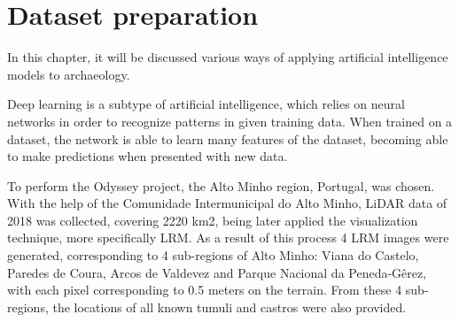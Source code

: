 
\chapter{Dataset preparation}

\begin{introduction}
In this chapter, it will be discussed various ways of applying artificial intelligence models to archaeology.
\end{introduction}





Deep learning is a subtype of artificial intelligence, which relies on neural networks in order to recognize patterns in given training data. When trained on a dataset, the network is able to learn many features of the dataset, becoming able to make predictions when presented with new data.



%
%

To perform the Odyssey project, the Alto Minho region, Portugal, was chosen. With the help of the Comunidade Intermunicipal do Alto Minho, LiDAR data of 2018 was collected, covering 2220 km2, being later applied the visualization technique, more specifically LRM. As a result of this process 4 LRM images were generated, corresponding to 4 sub-regions of Alto Minho: Viana do Castelo, Paredes de Coura, Arcos de Valdevez and Parque Nacional da Peneda-Gêrez, with each pixel corresponding to 0.5 meters on the terrain.
From these 4 sub-regions, the locations of all known tumuli and castros were also provided.

